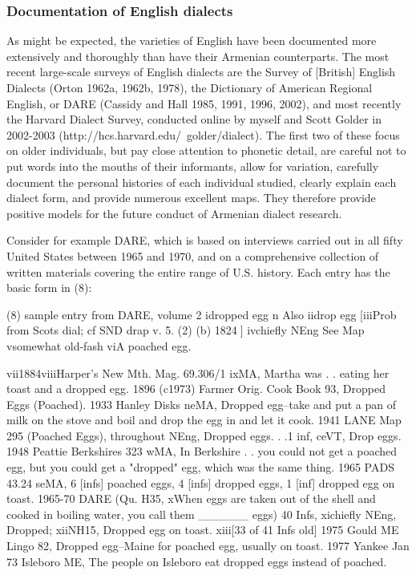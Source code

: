 \subsubsection{Documentation of English dialects}


As might be expected, the varieties of English have been documented more extensively and thoroughly than have their Armenian counterparts. The most recent large-scale surveys of English dialects are the Survey of [British] English Dialects (Orton 1962a, 1962b, 1978), the Dictionary of American Regional English, or DARE (Cassidy and Hall 1985, 1991, 1996, 2002), and most recently the Harvard Dialect Survey, conducted online by myself and Scott Golder in 2002-2003 (http://hcs.harvard.edu/~golder/dialect). The first two of these focus on older individuals, but pay close attention to phonetic detail, are careful not to put words into the mouths of their informants, allow for variation, carefully document the personal histories of each individual studied, clearly explain each dialect form, and provide numerous excellent maps. They therefore provide positive models for the future conduct of Armenian dialect research.

Consider for example DARE, which is based on interviews carried out in all fifty United States between 1965 and 1970, and on a comprehensive collection of written materials covering the entire range of U.S. history. Each entry has the basic form in (8):

\begin{exe}
	
	(8) sample entry from DARE, volume 2
	idropped egg n Also iidrop egg [iiiProb from Scots dial; cf SND drap v. 5. (2) (b) 1824] ivchiefly NEng See Map vsomewhat old-fash 
	viA poached egg. 
	
	vii1884viiiHarper's New Mth. Mag. 69.306/1 ixMA, Martha was . . eating her toast and a dropped egg. 1896 (c1973) Farmer Orig. Cook Book 93, Dropped Eggs (Poached). 1933 Hanley Disks neMA, Dropped egg--take and put a pan of milk on the stove and boil and drop the egg in and let it cook. 1941 LANE Map 295 (Poached Eggs), throughout NEng, Dropped eggs. . .1 inf, ceVT, Drop eggs. 1948 Peattie Berkshires 323 wMA, In Berkshire . . you could not get a poached egg, but you could get a "dropped" egg, which was the same thing. 1965 PADS 43.24 seMA, 6 [infs] poached eggs, 4 [infs] dropped eggs, 1 [inf] dropped egg on toast. 1965-70 DARE (Qu. H35, xWhen eggs are taken out of the shell and cooked in boiling water, you call them ______ eggs) 40 Infs, xichiefly NEng, Dropped; xiiNH15, Dropped egg on toast. xiii[33 of 41 Infs old]  1975 Gould ME Lingo 82, Dropped egg--Maine for poached egg, usually on toast. 1977 Yankee Jan 73 Isleboro ME, The people on Isleboro eat dropped eggs instead of poached. 
	
\end{exe}



